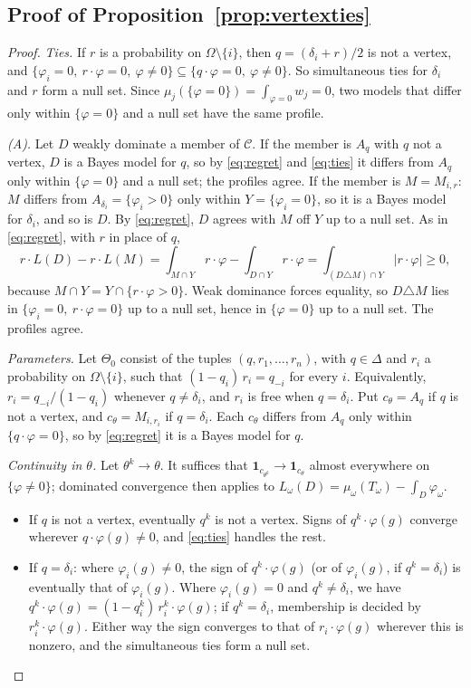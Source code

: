 \documentclass[11pt]{article}
\theoremstyle{definition}
\theoremstyle{remark}
\newcommand{\C}{\mathcal C}
\newcommand{\one}{\mathbf 1}
\begin{document}
\subsection{Proof of Proposition~\ref{prop:vertexties}}
\begin{proof}
\emph{Ties.} If $r$ is a probability on $\Omega\setminus\{i\}$, then $q=(\delta_i+r)/2$ is not a vertex, and $\{\varphi_i=0,\ r\cdot\varphi=0,\ \varphi\ne0\}\subseteq\{q\cdot\varphi=0,\ \varphi\ne0\}$. So simultaneous ties for $\delta_i$ and $r$ form a null set. Since $\mu_j(\{\varphi=0\})=\int_{\varphi=0}w_j=0$, two models that differ only within $\{\varphi=0\}$ and a null set have the same profile.

\emph{(A).} Let $D$ weakly dominate a member of $\C$. If the member is $A_q$ with $q$ not a vertex, $D$ is a Bayes model for $q$, so by \eqref{eq:regret} and \eqref{eq:ties} it differs from $A_q$ only within $\{\varphi=0\}$ and a null set; the profiles agree. If the member is $M=M_{i,r}$: $M$ differs from $A_{\delta_i}=\{\varphi_i>0\}$ only within $Y=\{\varphi_i=0\}$, so it is a Bayes model for $\delta_i$, and so is $D$. By \eqref{eq:regret}, $D$ agrees with $M$ off $Y$ up to a null set. As in \eqref{eq:regret}, with $r$ in place of $q$,
\[
 r\cdot L(D)-r\cdot L(M)=\int_{M\cap Y}r\cdot\varphi-\int_{D\cap Y}r\cdot\varphi=\int_{(D\triangle M)\cap Y}|r\cdot\varphi|\ge0,
\]
because $M\cap Y=Y\cap\{r\cdot\varphi>0\}$. Weak dominance forces equality, so $D\triangle M$ lies in $\{\varphi_i=0,\ r\cdot\varphi=0\}$ up to a null set, hence in $\{\varphi=0\}$ up to a null set. The profiles agree.

\emph{Parameters.} Let $\Theta_0$ consist of the tuples $(q,r_1,\dots,r_n)$, with $q\in\Delta$ and $r_i$ a probability on $\Omega\setminus\{i\}$, such that $(1-q_i)\,r_i=q_{-i}$ for every $i$. Equivalently, $r_i=q_{-i}/(1-q_i)$ whenever $q\ne\delta_i$, and $r_i$ is free when $q=\delta_i$. Put $c_\theta=A_q$ if $q$ is not a vertex, and $c_\theta=M_{i,r_i}$ if $q=\delta_i$. Each $c_\theta$ differs from $A_q$ only within $\{q\cdot\varphi=0\}$, so by \eqref{eq:regret} it is a Bayes model for $q$.

\emph{Continuity in $\theta$.} Let $\theta^k\to\theta$. It suffices that $\one_{c_{\theta^k}}\to\one_{c_\theta}$ almost everywhere on $\{\varphi\ne0\}$; dominated convergence then applies to $L_\omega(D)=\mu_\omega(T_\omega)-\int_D\varphi_\omega$.
\begin{itemize}
\item If $q$ is not a vertex, eventually $q^k$ is not a vertex. Signs of $q^k\cdot\varphi(g)$ converge wherever $q\cdot\varphi(g)\ne0$, and \eqref{eq:ties} handles the rest.
\item If $q=\delta_i$: where $\varphi_i(g)\ne0$, the sign of $q^k\cdot\varphi(g)$ (or of $\varphi_i(g)$, if $q^k=\delta_i$) is eventually that of $\varphi_i(g)$. Where $\varphi_i(g)=0$ and $q^k\ne\delta_i$, we have $q^k\cdot\varphi(g)=(1-q^k_i)\,r^k_i\cdot\varphi(g)$; if $q^k=\delta_i$, membership is decided by $r^k_i\cdot\varphi(g)$. Either way the sign converges to that of $r_i\cdot\varphi(g)$ wherever this is nonzero, and the simultaneous ties form a null set.
\end{itemize}


\end{proof}
\end{document}
